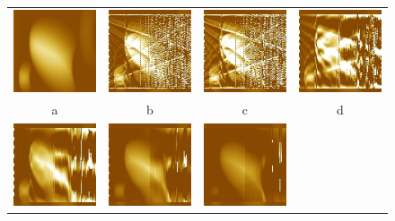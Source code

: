 \documentclass{procDDs}
\begin{document}
\begin{figure}[h!]\center%
	\begin{tabular}{cccc}
		\includegraphics[width=0.2\linewidth]{img/17/1.jpg}&
		\includegraphics[width=0.2\linewidth]{img/17/3.jpg}&
		\includegraphics[width=0.2\linewidth]{img/17/4.jpg}&
		\includegraphics[width=0.2\linewidth]{img/17/6.jpg}\\
		a & b & c & d\\
		\includegraphics[width=0.2\linewidth]{img/17/8.jpg}&
		\includegraphics[width=0.2\linewidth]{img/17/10.jpg}&
		\includegraphics[width=0.2\linewidth]{img/17/11.jpg}&

\end{tabular}
\end{figure}
\end{document}
